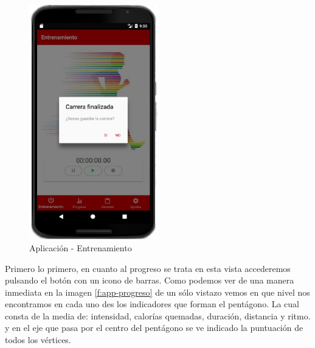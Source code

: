 \documentclass[a4paper, 11pt]{article}
\begin{document}
\begin{itemize}
                \begin{figure}[H]
                 \centering
                 \includegraphics[width=0.5\textwidth]{4stop}
                 \caption{Aplicación - Entrenamiento}
                 \label{f:app-stop}
                \end{figure}

      Primero lo primero, en cuanto al progreso se trata en esta vista accederemos pulsando el botón con un
      icono de barras. Como podemos ver de una manera inmediata en la imagen \ref{f:app-progreso} de un sólo
      vistazo vemos en que nivel nos encontramos en cada uno des los indicadores que forman el pentágono. La
      cual consta de la media de: intensidad, calorías quemadas, duración, distancia y ritmo. y en el eje que
      pasa por el centro del pentágono se ve indicado la puntuación de todos los vértices.\\



\end{itemize}
\end{document}
